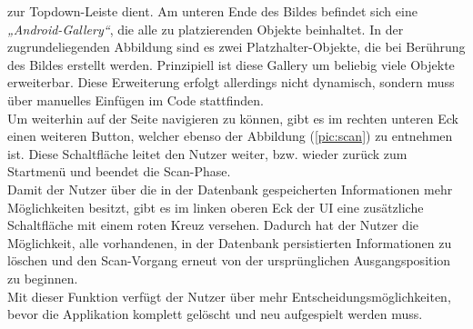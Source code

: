 zur Topdown-Leiste dient. Am unteren Ende des Bildes befindet sich eine \textit{„Android-Gallery“}, die alle zu platzierenden Objekte beinhaltet. In 
der zugrundeliegenden Abbildung sind es zwei Platzhalter-Objekte, die bei Berührung des Bildes erstellt werden. Prinzipiell ist diese Gallery um 
beliebig viele Objekte erweiterbar. Diese Erweiterung erfolgt allerdings nicht dynamisch, sondern muss über manuelles Einfügen im Code stattfinden. 
\\ 
\linebreak
Um weiterhin auf der Seite navigieren zu können, gibt es im rechten unteren Eck einen weiteren Button, welcher ebenso der Abbildung (\ref{pic:scan}) 
zu entnehmen ist. Diese Schaltfläche leitet den Nutzer weiter, bzw. wieder zurück zum Startmenü und beendet die Scan-Phase. 
\\ 
\linebreak
Damit der Nutzer über die in der Datenbank gespeicherten Informationen mehr Möglichkeiten besitzt, gibt es im linken oberen Eck der \acs{UI} eine zusätzliche 
Schaltfläche mit einem roten Kreuz versehen. Dadurch hat der Nutzer die Möglichkeit, alle vorhandenen, in der Datenbank persistierten Informationen zu 
löschen und den Scan-Vorgang erneut von der ursprünglichen Ausgangsposition zu beginnen. %
\\ 
Mit dieser Funktion verfügt der Nutzer über mehr Entscheidungsmöglichkeiten, bevor die Applikation komplett gelöscht und neu aufgespielt werden muss.
